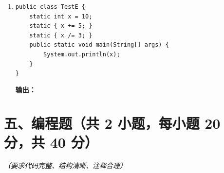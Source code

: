 \documentclass[a3paper, landscape, 11pt, twocolumn]{article}
\begin{document}
\begin{enumerate}[label=\arabic*., itemsep=1em]
	\item
	      \begin{lstlisting}[style=JavaExam]
public class TestE {
    static int x = 10;
    static { x += 5; }
    static { x /= 3; }
    public static void main(String[] args) {
        System.out.println(x);
    }
}
\end{lstlisting}
	      \textbf{输出：}\underline{\hspace{5cm}}
\end{enumerate}

\newpage

\section*{五、编程题（共 2 小题，每小题 20 分，共 40 分）}
\textit{（要求代码完整、结构清晰、注释合理）}
\end{document}
